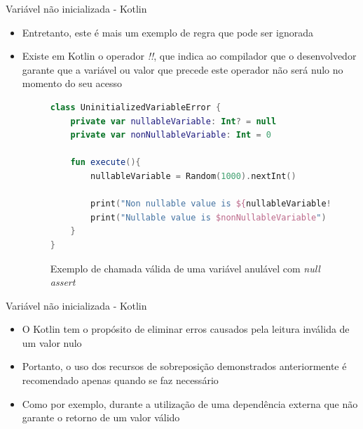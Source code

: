 \documentclass[brazilian]{beamer}
\begin{document}
\begin{frame}[fragile]{Variável não inicializada - Kotlin}
    \begin{itemize}
        \item Entretanto, este é mais um exemplo de regra que pode ser ignorada
        \item Existe em Kotlin o operador \emph{!!}, que indica ao compilador que o desenvolvedor garante que a variável ou valor que precede este operador não será nulo no momento do seu acesso
        \begin{figure}[H]
            \centering
            \begin{lstlisting}[language=Kotlin]
class UninitializedVariableError {
    private var nullableVariable: Int? = null
    private var nonNullableVariable: Int = 0

    fun execute(){
        nullableVariable = Random(1000).nextInt()
        
        print("Non nullable value is ${nullableVariable!!.toFloat()}")
        print("Nullable value is $nonNullableVariable")
    }
}
            \end{lstlisting}
            \caption{Exemplo de chamada válida de uma variável anulável com \textit{null assert}}
            \label{fig:kotlin_not_init_variable_valid_null_assert}
        \end{figure}
    \end{itemize}
\end{frame}

\begin{frame}{Variável não inicializada - Kotlin}
    \begin{itemize}
        \item O Kotlin tem o propósito de eliminar erros causados pela leitura inválida de um valor nulo
        \item Portanto, o uso dos recursos de sobreposição demonstrados anteriormente é recomendado apenas quando se faz necessário
        \item Como por exemplo, durante a utilização de uma dependência externa que não garante o retorno de um valor válido
    \end{itemize}
\end{frame}
\end{document}
